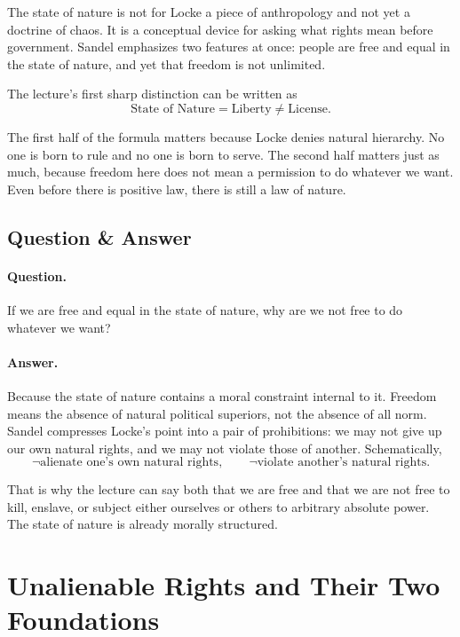 The state of nature is not for Locke a piece of anthropology and not yet a doctrine of chaos. It is a conceptual device for asking what rights mean before government. Sandel emphasizes two features at once: people are free and equal in the state of nature, and yet that freedom is not unlimited.

The lecture's first sharp distinction can be written as
\begin{equation}
\text{State of Nature}=\text{Liberty}\neq \text{License}.
\end{equation}

The first half of the formula matters because Locke denies natural hierarchy. No one is born to rule and no one is born to serve. The second half matters just as much, because freedom here does not mean a permission to do whatever we want. Even before there is positive law, there is still a law of nature.

\subsection{Question \& Answer}

\paragraph{Question.} If we are free and equal in the state of nature, why are we not free to do whatever we want?

\paragraph{Answer.} Because the state of nature contains a moral constraint internal to it. Freedom means the absence of natural political superiors, not the absence of all norm. Sandel compresses Locke's point into a pair of prohibitions: we may not give up our own natural rights, and we may not violate those of another. Schematically,
\begin{equation}
\neg \text{alienate one's own natural rights},
\qquad
\neg \text{violate another's natural rights}.
\end{equation}

That is why the lecture can say both that we are free and that we are not free to kill, enslave, or subject either ourselves or others to arbitrary absolute power. The state of nature is already morally structured.

\section{Unalienable Rights and Their Two Foundations}

